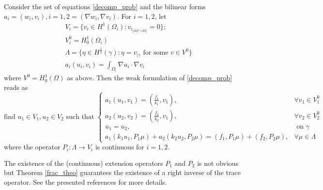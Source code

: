 \begin{proposition}
    Consider the set of equations \eqref{decomp_prob} and the bilinear forms \(a_i = (w_i, v_i), i=1,2 = (\nabla w_i, \nabla v_i)\). For \(i=1, 2\), let
    \begin{align*}
        &V_i = \{v_i \in H^1(\Omega_i): v_{i_{|\partial \Omega \cap \partial {\Omega_i}}}=0\};\\
        &V_i^0 = H^1_0(\Omega_i)\\
        &\Lambda = \{\eta \in H^\frac{1}{2}(\gamma): \eta = v_{|\gamma} \text{ for some } v \in V^0\} \\
        &a_i (u_i, v_i) = \int_{\Omega_i} \nabla u_i \cdot \nabla v_i
    \end{align*}
    where \(V^0 = H^1_0(\Omega)\) as above.
    Then the weak formulation of \eqref{decomp_prob} reads as
    \begin{equation}\label{weak_decomp}
        \text{find } u_1\in V_1, u_2 \in V_2 \text{ such that }
        \begin{cases}
            a_1(u_1, v_1) = (\frac{f_1}{k_1}, v_1), & \forall v_1 \in V_1^0\\
            a_2(u_2, v_2) = (\frac{f_2}{k_2}, v_1), & \forall v_2 \in V_2^0\\
            u_1 = u_2, & \text{ on } \gamma\\
            a_1(k_1 u_1, P_1 \mu) + a_2(k_2 u_2, P_2 \mu) = (f_1, P_1 \mu) + (f_2, P_2 \mu), & \forall \mu \in \Lambda
        \end{cases}
    \end{equation}
    where the operator \(P_i: \Lambda \rightarrow V_i\) is continuous for \(i=1, 2\).
\end{proposition}

\begin{remark}
    The existence of the (continuous) extension operators \(P_1\) and \(P_2\) is not obvious but Theorem \ref{frac_theo} guarantees the existence of a right inverse of the trace operator. See the presented references for more details. 
\end{remark}

